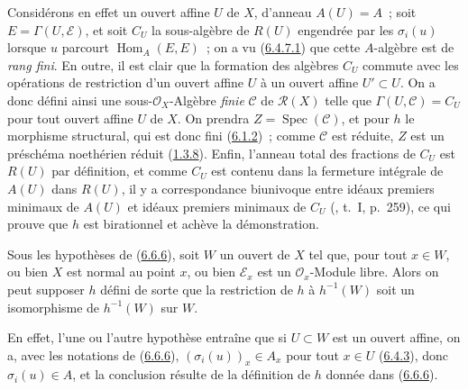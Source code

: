 Considérons en effet un ouvert affine $U$ de $X$, d'anneau $A(U)=A$~; soit
$E=\Gamma(U,\mathcal{E})$, et soit $C_U$ la sous-algèbre de $R(U)$ engendrée
par les $\sigma_i(u)$ lorsque $u$ parcourt $\operatorname{Hom}_A(E,E)$~; on
a vu (\hyperref[II.6.4.7.1-fr]{6.4.7.1}) que cette $A$-algèbre est de
\emph{rang fini}. En outre, il est clair que la formation des algèbres $C_U$
commute avec les opérations de restriction d'un ouvert affine $U$ à un ouvert
affine $U'\subset U$. On a donc défini ainsi une sous-$\mathcal{O}_X$-Algèbre
\emph{finie} $\mathcal{C}$ de $\mathcal{R}(X)$ telle que
$\Gamma(U,\mathcal{C})=C_U$ pour tout ouvert affine $U$ de $X$. On
prendra $Z=\operatorname{Spec}(\mathcal{C})$, et pour $h$ le morphisme
structural, qui est donc fini (\hyperref[II.6.1.2-fr]{6.1.2})~; comme
$\mathcal{C}$ est réduite, $Z$ est un préschéma noethérien réduit
(\hyperref[II.1.3.8-fr]{1.3.8}). Enfin, l'anneau total des fractions de $C_U$
est $R(U)$ par définition, et comme $C_U$ est contenu dans la fermeture
intégrale de $A(U)$ dans $R(U)$, il y a correspondance biunivoque entre idéaux
premiers minimaux de $A(U)$ et idéaux premiers minimaux de $C_U$
(\cite{I-13}, t.~I, p.~259), ce qui prouve que $h$ est birationnel et achève
la démonstration.

\begin{corollary}[6.6.7]
\label{II.6.6.7-fr}
Sous les hypothèses de \textup{(\hyperref[II.6.6.6-fr]{6.6.6})}, soit $W$ un ouvert
de $X$ tel que, pour tout $x\in W$, ou bien $X$ est normal au point $x$, ou
bien $\mathcal{E}_x$ est un $\mathcal{O}_x$-Module libre. Alors on peut
supposer $h$ défini de sorte que la restriction de $h$ à $h^{-1}(W)$ soit un
isomorphisme de $h^{-1}(W)$ sur $W$.
\end{corollary}

En effet, l'une ou l'autre hypothèse entraîne que si $U\subset W$ est un
ouvert affine, on a, avec les notations de
(\hyperref[II.6.6.6-fr]{6.6.6}), $(\sigma_i(u))_x\in A_x$ pour tout
$x\in U$ (\hyperref[II.6.4.3-fr]{6.4.3}), donc $\sigma_i(u)\in A$, et la
conclusion résulte de la définition de $h$ donnée dans
(\hyperref[II.6.6.6-fr]{6.6.6}).


